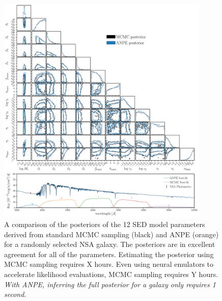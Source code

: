 \begin{figure}
\begin{center}
    \includegraphics[width=0.9\textwidth]{figs/corner.pdf}
    \caption{\label{fig:corner}
    A comparison of the posteriors of the 12 SED model parameters derived from
    standard MCMC sampling (black) and ANPE (orange) for a randomly selected
    NSA galaxy.
    The posteriors are in excellent agreement for all of the parameters. 
    Estimating the posterior using MCMC sampling requires X hours. 
    Even using neural emulators to accelerate likelihood evaluations, MCMC
    sampling requires Y hours. 
    \emph{With ANPE, inferring the full posterior for a galaxy only requires 1
    second.}
    }
\end{center}
\end{figure}

